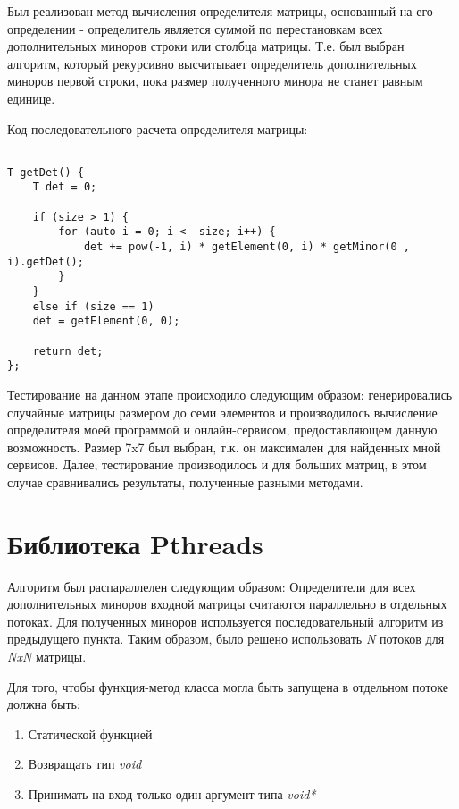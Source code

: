 \documentclass[10pt,a4paper]{report}
\begin{document}
	Был реализован метод вычисления определителя матрицы, основанный на его определении - определитель является суммой по перестановкам всех дополнительных миноров строки или столбца матрицы. Т.е. был выбран алгоритм, который рекурсивно высчитывает определитель дополнительных миноров первой строки, пока размер полученного минора не станет равным единице. 
	
	Код последовательного расчета определителя матрицы:
	
	\begin{lstlisting}
	
T getDet() {
	T det = 0;
	
	if (size > 1) {
		for (auto i = 0; i <  size; i++) { 
			det += pow(-1, i) * getElement(0, i) * getMinor(0 , i).getDet();
		}
	}
	else if (size == 1)
	det = getElement(0, 0);
	
	return det;
};
	\end{lstlisting}
	
	Тестирование на данном этапе происходило следующим образом: генерировались случайные матрицы размером до семи элементов и производилось вычисление определителя моей программой и онлайн-сервисом, предоставляющем данную возможность. Размер 7x7 был выбран, т.к. он максимален для найденных мной сервисов. Далее, тестирование производилось и для больших матриц, в этом случае сравнивались результаты, полученные разными методами.
	
	\section{Библиотека Pthreads}
	
	Алгоритм был распараллелен следующим образом:
	Определители для всех дополнительных миноров входной матрицы считаются параллельно в отдельных потоках. Для полученных миноров используется последовательный алгоритм из предыдущего пункта. Таким образом, было решено использовать \textit{N} потоков для \textit{NxN} матрицы. 
	
	Для того, чтобы функция-метод класса могла быть запущена в отдельном потоке должна быть:
	
	\begin{enumerate}
		\item Статической функцией
		
		\item Возвращать тип \textit{void}
		
		\item Принимать на вход только один аргумент типа   \textit{void*}
	\end{enumerate}	
	
\end{document}
